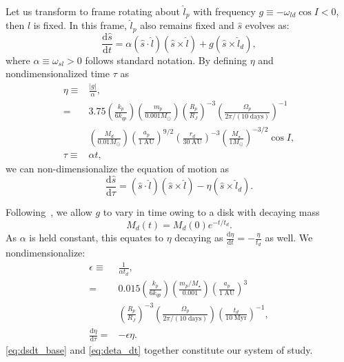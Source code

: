 \documentclass[
        fleqn,
        usenatbib,
        referee,
    ]{mnras}
\newcommand*{\rd}[2]{\frac{\mathrm{d}#1}{\mathrm{d}#2}}
\newcommand*{\abs}[1]{\left|#1\right|}
\newcommand*{\p}[1]{\left(#1\right)}
\begin{document}
Let us transform to frame rotating about $\hat{l}_p$ with frequency $g \equiv
-\omega_{ld}\cos I < 0$, then $\hat{l}$ is fixed. In this frame, $\hat{l}_p$
also remains fixed and $\hat{s}$ evolves as:
\begin{equation}
    \rd{\hat{s}}{t} = \alpha \p{\hat{s} \cdot \hat{l}}
            \p{\hat{s} \times \hat{l}}
        + g\p{\hat{s} \times \hat{l}_d},
\end{equation}
where $\alpha \equiv \omega_{sl} > 0$ follows standard notation. By defining
$\eta$ and nondimensionalized time $\tau$ as
\begin{align}
    \eta \equiv{}& \frac{\abs{g}}{\alpha}\label{eq:eta},\\
        ={}& 3.75 \p{\frac{k_p}{6k_{qp}}}
            \p{\frac{m_p}{0.001 M_\odot}}
            \p{\frac{R_p}{R_J}}^{-3}
            \p{\frac{\Omega_p}{2\pi/\p{10\;\mathrm{days}}}}^{-1}\nonumber\\
        &\p{\frac{M_d}{0.01 M_{\odot}}}
            \p{\frac{a_p}{1\;\mathrm{AU}}}^{9/2}
            \p{\frac{r_d}{30 \;\mathrm{AU}}}^{-3}
            \p{\frac{M_\star}{1M_{\odot}}}^{-3/2}
            \cos I,\\
    \tau \equiv{}& \alpha t,
\end{align}
we can non-dimensionalize the equation of motion as
\begin{equation}
    \rd{\hat{s}}{\tau} = \p{\hat{s} \cdot \hat{l}}
            \p{\hat{s} \times \hat{l}}
        - \eta\p{\hat{s} \times \hat{l}_d}. \label{eq:dsdt_base}
\end{equation}

Following~\cite{millholland_disk}, we allow $g$ to vary in time owing to a
disk with decaying mass
\begin{equation}
    M_d(t) = M_d(0)e^{-t/t_d}.
\end{equation}
As $\alpha$ is held constant, this equates to $\eta$ decaying as $\rd{\eta}{t} =
-\frac{\eta}{t_d}$ as well. We nondimensionalize:
\begin{align}
    \epsilon \equiv{}& \frac{1}{\alpha t_d},\\
        ={}& 0.015 \p{\frac{k_p}{6k_{qp}}}
            \p{\frac{m_p/M_\star}{0.001}}
            \p{\frac{a_p}{1\;\mathrm{AU}}}^3\nonumber\\
        &\p{\frac{R_p}{R_J}}^{-3}
            \p{\frac{\Omega_p}{2\pi/\p{10\;\mathrm{days}}}}
            \p{\frac{t_d}{10\;\mathrm{Myr}}}^{-1},\\
    \rd{\eta}{\tau} ={}& -\epsilon \eta.\label{eq:deta_dt}
\end{align}
\autoref{eq:dsdt_base} and \autoref{eq:deta_dt} together constitute our system
of study.
\end{document}
